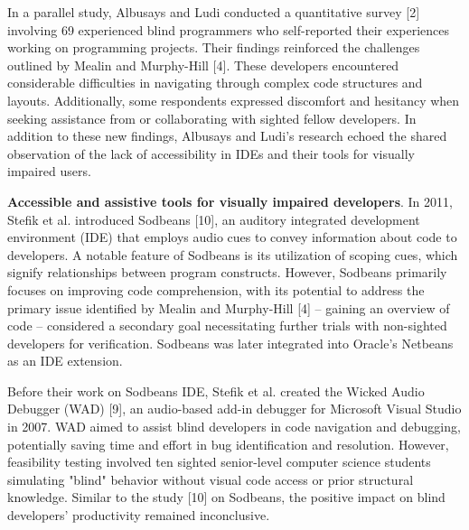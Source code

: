 In a parallel study, Albusays and Ludi conducted a quantitative survey [2] involving 69 experienced blind programmers who self-reported their experiences working on programming projects. Their findings reinforced the challenges outlined by Mealin and Murphy-Hill [4]. These developers encountered considerable difficulties in navigating through complex code structures and layouts. Additionally, some respondents expressed discomfort and hesitancy when seeking assistance from or collaborating with sighted fellow developers. In addition to these new findings, Albusays and Ludi's research echoed the shared observation of the lack of accessibility in IDEs and their tools for visually impaired users.



{\bf Accessible and assistive tools for visually impaired developers}.
In 2011, Stefik et al. introduced Sodbeans [10], an auditory
integrated development environment (IDE) that employs audio cues to
convey information about code to developers. A notable feature of
Sodbeans is its utilization of scoping cues, which signify
relationships between program constructs.
However, Sodbeans primarily focuses on improving code comprehension,
with its potential to address the primary issue identified by Mealin
and Murphy-Hill [4] – gaining an overview of code – considered a
secondary goal necessitating further trials with non-sighted
developers for verification. Sodbeans was later integrated into
Oracle's Netbeans as an IDE extension.

Before their work on Sodbeans IDE, Stefik et al. created the Wicked Audio Debugger (WAD) [9], an audio-based add-in debugger for Microsoft Visual Studio in 2007. WAD aimed to assist blind developers in code navigation and debugging, potentially saving time and effort in bug identification and resolution. However, feasibility testing involved ten sighted senior-level computer science students simulating "blind" behavior without visual code access or prior structural knowledge. Similar to the study [10] on Sodbeans, the positive impact on blind developers' productivity remained inconclusive.

